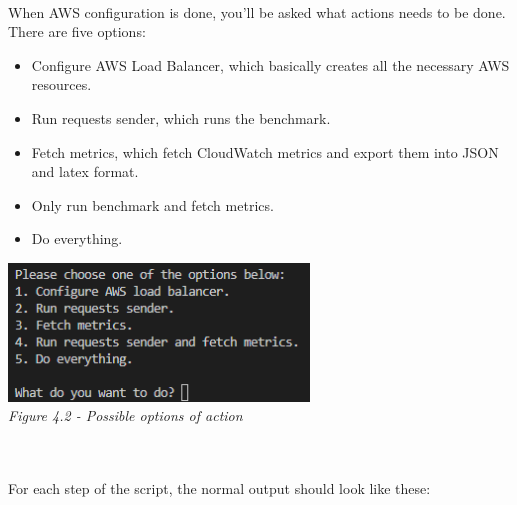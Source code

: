 \paragraph{}When AWS configuration is done, you'll be asked what actions needs to be done. There are five options:
\begin{itemize}
  \item Configure AWS Load Balancer, which basically creates all the necessary AWS resources.
  \item Run requests sender, which runs the benchmark.
  \item Fetch metrics, which fetch CloudWatch metrics and export them into JSON and latex format.
  \item Only run benchmark and fetch metrics.
  \item Do everything.
\end{itemize}

\begin{center}
\includegraphics[width=8cm]{Resources/options.png}\\
\emph{Figure 4.2 - Possible options of action}
\end{center}\\

\lef\paragraph{}For each step of the script, the normal output should look like these:

